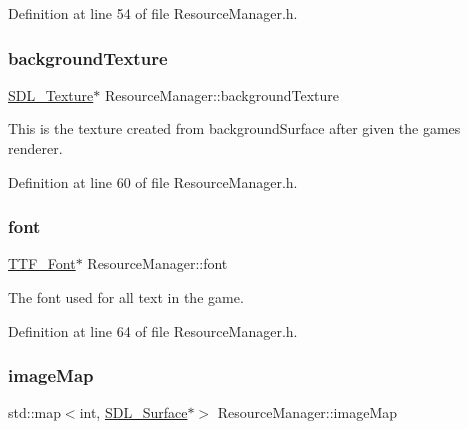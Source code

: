 Definition at line 54 of file Resource\+Manager.\+h.

\mbox{\label{class_resource_manager_ae8f8a6573b843ad8394bb44a8839bcc4}} 
\subsubsection{\texorpdfstring{backgroundTexture}{backgroundTexture}}
{\footnotesize\ttfamily \mbox{\hyperlink{_s_d_l__render_8h_a17850d7f1f5de457727cb3cf66b3a7f5}{S\+D\+L\+\_\+\+Texture}}$\ast$ Resource\+Manager\+::background\+Texture}



This is the texture created from background\+Surface after given the game\textquotesingle{}s renderer. 



Definition at line 60 of file Resource\+Manager.\+h.

\mbox{\label{class_resource_manager_a178a34ee6625bc871e701ff1df56d3ac}} 
\subsubsection{\texorpdfstring{font}{font}}
{\footnotesize\ttfamily \mbox{\hyperlink{_s_d_l__ttf_8h_ac3b14e1c2946c0cf19776fe568d9abcf}{T\+T\+F\+\_\+\+Font}}$\ast$ Resource\+Manager\+::font}



The font used for all text in the game. 



Definition at line 64 of file Resource\+Manager.\+h.

\mbox{\label{class_resource_manager_a9b85004d89011021ad4b35de520e22d3}} 
\subsubsection{\texorpdfstring{imageMap}{imageMap}}
{\footnotesize\ttfamily std\+::map$<$int, \mbox{\hyperlink{struct_s_d_l___surface}{S\+D\+L\+\_\+\+Surface}}$\ast$$>$ Resource\+Manager\+::image\+Map}



